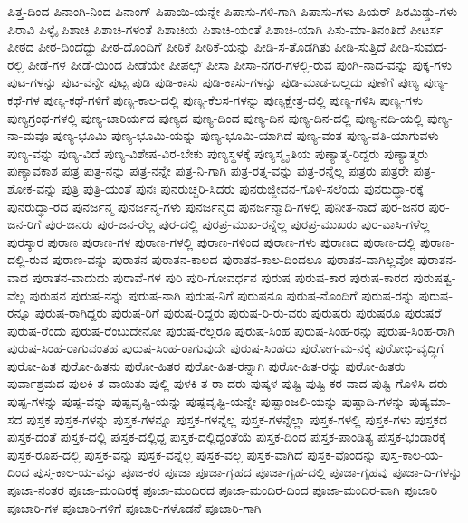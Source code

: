 {ಪಿತ್ತ-ದಿಂದ
ಪಿನಾಂಗಿ-ನಿಂದ
ಪಿನಾಂಗ್
ಪಿಪಾಯಿ-ಯನ್ನೇ
ಪಿಪಾಸು-ಗಳಿ-ಗಾಗಿ
ಪಿಪಾಸು-ಗಳು
ಪಿಯರ್
ಪಿರಮಿಡ್ಡು-ಗಳು
ಪಿರಾವಿ
ಪಿಳ್ಳೈ
ಪಿಶಾಚಿ
ಪಿಶಾಚಿ-ಗಳಂತೆ
ಪಿಶಾಚಿಯ
ಪಿಶಾಚಿ-ಯಂತೆ
ಪಿಶಾಚಿ-ಯಾಗಿ
ಪಿಸು-ಮಾ-ತಿನಂತಿದೆ
ಪೀಟರ್ಸ
ಪೀಠದ
ಪೀಠ-ದಿಂದೆದ್ದು
ಪೀಠ-ದೊಂದಿಗೆ
ಪೀಠಿಕೆ
ಪೀಠಿಕೆ-ಯನ್ನು
ಪೀಡಿ-ಸ-ತೊಡಗಿತು
ಪೀಡಿ-ಸುತ್ತಿದೆ
ಪೀಡಿ-ಸುವುದ-ರಲ್ಲಿ
ಪೀಡೆ-ಗಳ
ಪೀಡೆ-ಯಿಂದ
ಪೀಡೆಯೇ
ಪೀಪಲ್ಸ್
ಪೀಸಾ
ಪೀಸಾ-ನಗರ-ಗಳಲ್ಲಿ-ರುವ
ಪುಂಗಿ-ನಾದ-ವನ್ನು
ಪುಕ್ಕ-ಗಳು
ಪುಟ-ಗಳನ್ನು
ಪುಟ-ವನ್ನೇ
ಪುಟ್ಟ
ಪುಡಿ
ಪುಡಿ-ಕಾಸು
ಪುಡಿ-ಕಾಸು-ಗಳನ್ನು
ಪುಡಿ-ಮಾಡ-ಬಲ್ಲದು
ಪುಣೆಗೆ
ಪುಣ್ಯ
ಪುಣ್ಯ-ಕಥೆ-ಗಳ
ಪುಣ್ಯ-ಕಥೆ-ಗಳಿಗೆ
ಪುಣ್ಯ-ಕಾಲ-ದಲ್ಲಿ
ಪುಣ್ಯ-ಕೆಲಸ-ಗಳನ್ನು
ಪುಣ್ಯಕ್ಷೇತ್ರ-ದಲ್ಲಿ
ಪುಣ್ಯ-ಗಳಿಸಿ
ಪುಣ್ಯ-ಗಳು
ಪುಣ್ಯಗ್ರಂಥ-ಗಳಲ್ಲಿ
ಪುಣ್ಯ-ಚಾರಿರ್ಯದ
ಪುಣ್ಯದ
ಪುಣ್ಯ-ದಿಂದ
ಪುಣ್ಯ-ದಿನ
ಪುಣ್ಯ-ದಿನ-ದಲ್ಲಿ
ಪುಣ್ಯ-ನದಿ-ಯಲ್ಲಿ
ಪುಣ್ಯ-ನಾ-ಮವೂ
ಪುಣ್ಯ-ಭೂಮಿ
ಪುಣ್ಯ-ಭೂಮಿ-ಯನ್ನು
ಪುಣ್ಯ-ಭೂಮಿ-ಯಾಗಿದೆ
ಪುಣ್ಯ-ವಂತ
ಪುಣ್ಯ-ವತಿ-ಯಾಗುವಳು
ಪುಣ್ಯ-ವನ್ನು
ಪುಣ್ಯ-ವಿದೆ
ಪುಣ್ಯ-ವಿಶೇಷ-ವಿರ-ಬೇಕು
ಪುಣ್ಯಸ್ಥಳಕ್ಕೆ
ಪುಣ್ಯಸ್ಮೃ-ತಿಯ
ಪುಣ್ಯಾತ್ಮ-ರಿದ್ದರು
ಪುಣ್ಯಾತ್ಮರು
ಪುಣ್ಯಾವಕಾಶ
ಪುತ್ರ
ಪುತ್ರ-ನನ್ನು
ಪುತ್ರ-ನನ್ನೇ
ಪುತ್ರ-ನಿ-ಗಾಗಿ
ಪುತ್ರ-ರತ್ನ-ವನ್ನು
ಪುತ್ರ-ರನ್ನೆಲ್ಲ
ಪುತ್ರರು
ಪುತ್ರರೇ
ಪುತ್ರ-ಶೋಕ-ವನ್ನು
ಪುತ್ರಿ
ಪುತ್ರಿ-ಯಂತೆ
ಪುನಃ
ಪುನರುಚ್ಚರಿ-ಸಿದರು
ಪುನರುಜ್ಜೀವನ-ಗೊಳಿ-ಸಲೆಂದು
ಪುನರುದ್ಧಾ-ರಕ್ಕೆ
ಪುನರುದ್ಧಾ-ರದ
ಪುನರ್ಜನ್ಮ
ಪುನರ್ಜನ್ಮ-ಗಳು
ಪುನರ್ಜನ್ಮದ
ಪುನರ್ಜನ್ಮಾದಿ-ಗಳಲ್ಲಿ
ಪುನೀತ-ನಾದೆ
ಪುರ-ಜನರ
ಪುರ-ಜನ-ರಿಗೆ
ಪುರ-ಜನರು
ಪುರ-ಜನ-ರೆಲ್ಲ
ಪುರ-ದಲ್ಲಿ
ಪುರಪ್ರ-ಮುಖ-ರನ್ನೆಲ್ಲ
ಪುರಪ್ರ-ಮುಖರು
ಪುರ-ವಾಸಿ-ಗಳೆಲ್ಲ
ಪುರಸ್ಕಾರ
ಪುರಾಣ
ಪುರಾಣ-ಗಳ
ಪುರಾಣ-ಗಳಲ್ಲಿ
ಪುರಾಣ-ಗಳಿಂದ
ಪುರಾಣ-ಗಳು
ಪುರಾಣದ
ಪುರಾಣ-ದಲ್ಲಿ
ಪುರಾಣ-ದಲ್ಲಿ-ರುವ
ಪುರಾಣ-ವನ್ನು
ಪುರಾತನ
ಪುರಾತನ-ಕಾಲದ
ಪುರಾತನ-ಕಾಲ-ದಿಂದಲೂ
ಪುರಾತನ-ವಾಗಿಲ್ಲವೋ
ಪುರಾತನ-ವಾದ
ಪುರಾತನ-ವಾದುದು
ಪುರಾವೆ-ಗಳ
ಪುರಿ
ಪುರಿ-ಗೋವರ್ಧನ
ಪುರುಷ
ಪುರುಷ-ಕಾರ
ಪುರುಷ-ಕಾರದ
ಪುರುಷತ್ವ-ವೆಲ್ಲ
ಪುರುಷನ
ಪುರುಷ-ನನ್ನು
ಪುರುಷ-ನಾಗಿ
ಪುರುಷ-ನಿಗೆ
ಪುರುಷನೂ
ಪುರುಷ-ನೊಂದಿಗೆ
ಪುರುಷ-ರನ್ನು
ಪುರುಷ-ರನ್ನೂ
ಪುರುಷ-ರಾಗಿದ್ದರು
ಪುರುಷ-ರಿಗೆ
ಪುರುಷ-ರಿದ್ದರು
ಪುರುಷ-ರಿ-ರು-ವರು
ಪುರುಷರು
ಪುರುಷರೂ
ಪುರುಷರೆ
ಪುರುಷ-ರೆಂದು
ಪುರುಷ-ರೆಂಬುದೇನೋ
ಪುರುಷ-ರೆಲ್ಲರೂ
ಪುರುಷ-ಸಿಂಹ
ಪುರುಷ-ಸಿಂಹ-ರನ್ನು
ಪುರುಷ-ಸಿಂಹ-ರಾಗಿ
ಪುರುಷ-ಸಿಂಹ-ರಾಗುವಂತಹ
ಪುರುಷ-ಸಿಂಹ-ರಾಗುವುದೇ
ಪುರುಷ-ಸಿಂಹರು
ಪುರೋಗ-ಮ-ನಕ್ಕೆ
ಪುರೋಭಿ-ವೃದ್ಧಿಗೆ
ಪುರೋ-ಹಿತ
ಪುರೋ-ಹಿತನು
ಪುರೋ-ಹಿತರ
ಪುರೋ-ಹಿತ-ರನ್ನಾಗಿ
ಪುರೋ-ಹಿತ-ರನ್ನು
ಪುರೋ-ಹಿತರು
ಪುರ್ವಾಶ್ರಮದ
ಪುಲಕಿ-ತ-ವಾಯಿತು
ಪುಲ್ಲಿ
ಪುಳಕಿ-ತ-ರಾ-ದರು
ಪುಷ್ಕಳ
ಪುಷ್ಟಿ
ಪುಷ್ಟಿ-ಕರ-ವಾದ
ಪುಷ್ಟಿ-ಗೊಳಿಸಿ-ದರು
ಪುಷ್ಪ-ಗಳನ್ನು
ಪುಷ್ಪ-ವನ್ನು
ಪುಷ್ಪವೃಷ್ಟಿ-ಯನ್ನು
ಪುಷ್ಪವೃಷ್ಟಿ-ಯನ್ನೇ
ಪುಷ್ಪಾಂಜಲಿ-ಯನ್ನು
ಪುಷ್ಪಾದಿ-ಗಳನ್ನು
ಪುಷ್ಯಮಾ-ಸದ
ಪುಸ್ತಕ
ಪುಸ್ತಕ-ಗಳನ್ನು
ಪುಸ್ತಕ-ಗಳನ್ನೂ
ಪುಸ್ತಕ-ಗಳನ್ನೆಲ್ಲ
ಪುಸ್ತಕ-ಗಳನ್ನೆಲ್ಲಾ
ಪುಸ್ತಕ-ಗಳಲ್ಲಿ
ಪುಸ್ತಕ-ಗಳು
ಪುಸ್ತಕದ
ಪುಸ್ತಕ-ದಂತೆ
ಪುಸ್ತಕ-ದಲ್ಲಿ
ಪುಸ್ತಕ-ದಲ್ಲಿದ್ದ
ಪುಸ್ತಕ-ದಲ್ಲಿದ್ದಂತೆಯೆ
ಪುಸ್ತಕ-ದಿಂದ
ಪುಸ್ತಕ-ಪಾಂಡಿತ್ಯ
ಪುಸ್ತಕ-ಭಂಡಾರಕ್ಕೆ
ಪುಸ್ತಕ-ರೂಪ-ದಲ್ಲಿ
ಪುಸ್ತಕ-ವನ್ನು
ಪುಸ್ತಕ-ವನ್ನೆಲ್ಲ
ಪುಸ್ತಕ-ವಲ್ಲ
ಪುಸ್ತಕ-ವಾಗಿದೆ
ಪುಸ್ತಕ-ವೊಂದನ್ನು
ಪುಸ್ತ-ಕಾಲ-ಯ-ದಿಂದ
ಪುಸ್ತ-ಕಾಲ-ಯ-ವನ್ನು
ಪೂಜ-ಕರ
ಪೂಜಾ
ಪೂಜಾ-ಗೃಹದ
ಪೂಜಾ-ಗೃಹ-ದಲ್ಲಿ
ಪೂಜಾ-ಗೃಹವು
ಪೂಜಾ-ದಿ-ಗಳನ್ನು
ಪೂಜಾ-ನಂತರ
ಪೂಜಾ-ಮಂದಿರಕ್ಕೆ
ಪೂಜಾ-ಮಂದಿರದ
ಪೂಜಾ-ಮಂದಿರ-ದಿಂದ
ಪೂಜಾ-ಮಂದಿರ-ವಾಗಿ
ಪೂಜಾರಿ
ಪೂಜಾರಿ-ಗಳ
ಪೂಜಾರಿ-ಗಳಿಗೆ
ಪೂಜಾರಿ-ಗಳೊಡನೆ
ಪೂಜಾರಿ-ಗಾಗಿ
}
